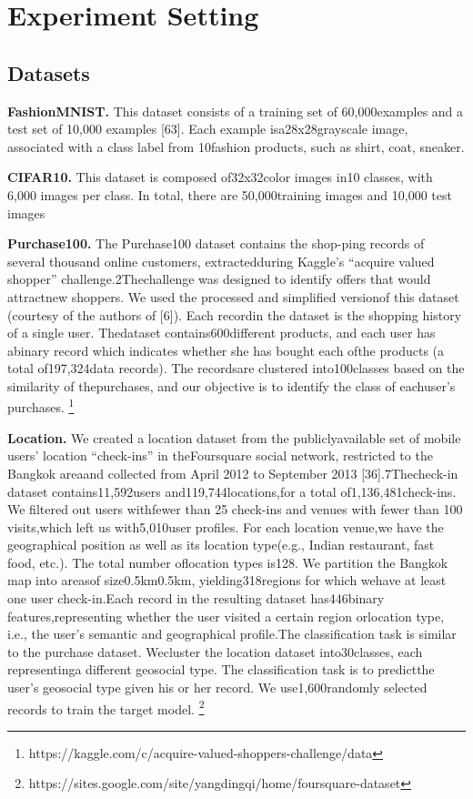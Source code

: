 \section{Experiment Setting}


\subsection{Datasets}

\textbf{FashionMNIST.} This dataset consists of a training set of 60,000examples and a test set of 10,000 examples [63]. Each example isa28x28grayscale image, associated with a class label from 10fashion products, such as shirt, coat, sneaker.

\textbf{CIFAR10.} This dataset is composed of32x32color images in10 classes, with 6,000 images per class. In total, there are 50,000training images and 10,000 test images

\textbf{Purchase100.} The  Purchase100  dataset  contains  the  shop-ping  records  of  several  thousand  online  customers,  extractedduring  Kaggle’s  “acquire  valued  shopper”  challenge.2Thechallenge  was  designed  to  identify  offers  that  would  attractnew  shoppers.  We  used  the  processed  and  simplified  versionof  this  dataset  (courtesy  of  the  authors  of  [6]).  Each  recordin  the  dataset  is  the  shopping  history  of  a  single  user.  Thedataset  contains600different  products,  and  each  user  has  abinary record which indicates whether she has bought each ofthe  products  (a  total  of197,324data  records).  The  recordsare  clustered  into100classes  based  on  the  similarity  of  thepurchases,  and  our  objective  is  to  identify  the  class  of  eachuser’s purchases.
\footnote{https://kaggle.com/c/acquire-valued-shoppers-challenge/data}

\textbf{Location.} We created a location dataset from the publiclyavailable set of mobile users’ location “check-ins” in theFoursquare social network, restricted to the Bangkok areaand collected from April 2012 to September 2013 [36].7Thecheck-in dataset contains11,592users and119,744locations,for a total of1,136,481check-ins. We filtered out users withfewer than 25 check-ins and venues with fewer than 100 visits,which left us with5,010user profiles. For each location venue,we have the geographical position as well as its location type(e.g., Indian restaurant, fast food, etc.). The total number oflocation types is128. We partition the Bangkok map into areasof size0.5km0.5km, yielding318regions for which wehave at least one user check-in.Each record in the resulting dataset has446binary features,representing whether the user visited a certain region orlocation type, i.e., the user’s semantic and geographical profile.The classification task is similar to the purchase dataset. Wecluster the location dataset into30classes, each representinga different geosocial type. The classification task is to predictthe user’s geosocial type given his or her record. We use1,600randomly selected records to train the target model. \footnote{https://sites.google.com/site/yangdingqi/home/foursquare-dataset}


